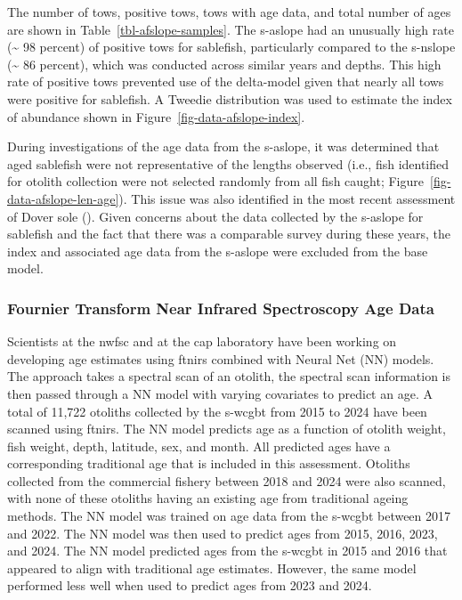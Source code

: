 \documentclass[
  english,
]{article}
\begin{document}
The number of tows, positive tows, tows with age data, and total number
of ages are shown in Table~\ref{tbl-afslope-samples}. The \gls{s-aslope}
had an unusually high rate (\textasciitilde{} 98 percent) of positive
tows for sablefish, particularly compared to the \gls{s-nslope}
(\textasciitilde{} 86 percent), which was conducted across similar years
and depths. This high rate of positive tows prevented use of the
delta-model given that nearly all tows were positive for sablefish. A
Tweedie distribution was used to estimate the index of abundance shown
in Figure~\ref{fig-data-afslope-index}.

During investigations of the age data from the \gls{s-aslope}, it was
determined that aged sablefish were not representative of the lengths
observed (i.e., fish identified for otolith collection were not selected
randomly from all fish caught; Figure~\ref{fig-data-afslope-len-age}).
This issue was also identified in the most recent assessment of Dover
sole (). Given
concerns about the data collected by the \gls{s-aslope} for sablefish
and the fact that there was a comparable survey during these years, the
index and associated age data from the \gls{s-aslope} were excluded from
the base model.

\subsubsection{Fournier Transform Near Infrared Spectroscopy Age
Data}\label{fournier-transform-near-infrared-spectroscopy-age-data}

Scientists at the \gls{nwfsc} and at the \gls{cap} laboratory have been
working on developing age estimates using \gls{ftnirs} combined with
Neural Net (NN) models. The approach takes a spectral scan of an
otolith, the spectral scan information is then passed through a NN model
with varying covariates to predict an age. A total of 11,722 otoliths
collected by the \gls{s-wcgbt} from 2015 to 2024 have been scanned using
\gls{ftnirs}. The NN model predicts age as a function of otolith weight,
fish weight, depth, latitude, sex, and month. All predicted ages have a
corresponding traditional age that is included in this assessment.
Otoliths collected from the commercial fishery between 2018 and 2024
were also scanned, with none of these otoliths having an existing age
from traditional ageing methods. The NN model was trained on age data
from the \gls{s-wcgbt} between 2017 and 2022. The NN model was then used
to predict ages from 2015, 2016, 2023, and 2024. The NN model predicted
ages from the \gls{s-wcgbt} in 2015 and 2016 that appeared to align with
traditional age estimates. However, the same model performed less well
when used to predict ages from 2023 and 2024.
\end{document}
